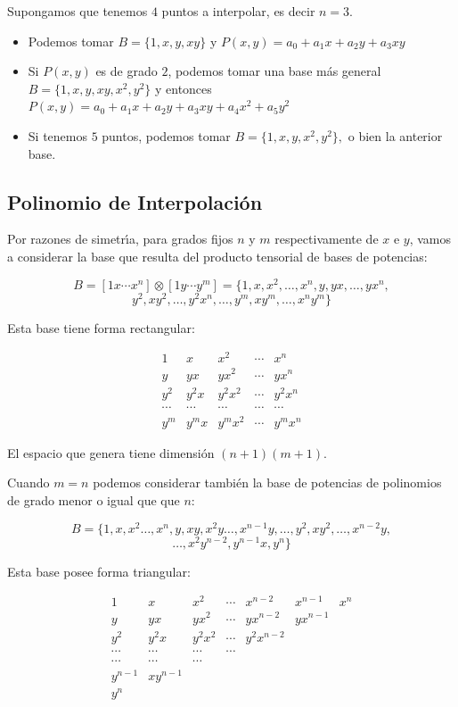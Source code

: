 \documentclass[twoside]{report}
\begin{document}
Supongamos que tenemos $4$ puntos a interpolar, es decir $n=3$.

\begin{itemize}
\item Podemos tomar $B=\{1,x,y,xy\}$ y $P(x,y)=a_0+a_1x+a_2y+a_3xy$
\item Si $P(x,y)$ es de grado $2$, podemos tomar una base m\'{a}s general $B=\{1,x,y,xy,x^2,y^2\}$ y entonces $P(x,y)=a_0+a_1x+a_2y+a_3xy+a_4x^2+a_5y^2$
\item Si tenemos $5$ puntos, podemos tomar $B=\{1,x,y,x^2,y^2\},$ o bien la anterior base.
\end{itemize}

\subsection{Polinomio de Interpolaci\'{o}n}

Por razones de simetr\'{\i}a, para grados fijos $n$ y $m$ respectivamente de $x$ e $y$, vamos a considerar la base que resulta del producto tensorial de bases de potencias:

$$B=[1 x \cdots x^n]\otimes[1 y \cdots y^m]=\{1,x,x^2, \ldots, x^n, y, yx, \ldots,yx^n, $$ $$y^2, xy^2, \ldots, y^2x^n, \ldots,y^m,xy^m, \ldots,x^ny^m\}$$

Esta base tiene forma rectangular:

$$\begin{array}{ccccc}
1 & x & x^2& \cdots & x^n\\
y & yx& yx^2 & \cdots& y x^n\\
y^2 & y^2x& y^2x^2 & \cdots& y^2 x^n\\
\cdots & \cdots& \cdots&\cdots&\cdots\\
y^m & y^mx& y^mx^2 & \cdots& y^m x^n
\end{array}$$

El espacio que genera tiene dimensi\'{o}n $(n+1)(m+1)$.

Cuando $m=n$ podemos considerar tambi\'{e}n la  base de potencias de polinomios de grado menor o igual que que $n$:

$$B=\{1,x,x^2\ldots,x^n, y, xy, x^2y \ldots,x^{n-1}y,\ldots, y^2, xy^2,\ldots, x^{n-2}y,$$ $$\ldots, x^2y^{n-2}, y^{n-1}x,y^n \}$$

Esta base posee forma triangular:

$$\begin{array}{ccccccc}
1 & x & x^2& \cdots &x^{n-2}&x^{n-1}& x^n\\
y & yx& yx^2 & \cdots& yx^{n-2}& y x^{n-1} & \\
y^2 & y^2x& y^2x^2 & \cdots& y^2 x^{n-2} & & \\
\cdots & \cdots& \cdots&\cdots&& &  \\
\cdots & \cdots& \cdots& & & & \\
 y^{n-1} & xy^{n-1} &  & & & &\\
 y^n & & & & & &
\end{array}$$
\end{document}
